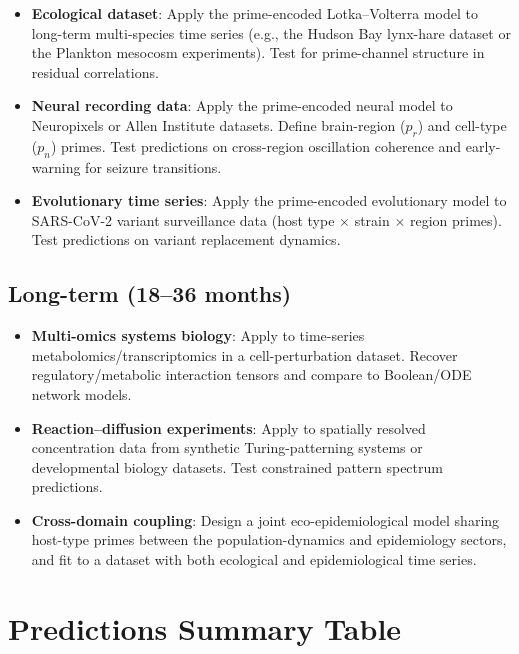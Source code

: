 \documentclass[12pt,letterpaper]{article}
\begin{document}
\begin{itemize}[leftmargin=*]
  \item \textbf{Ecological dataset}: Apply the prime-encoded Lotka--Volterra
    model to long-term multi-species time series (e.g., the Hudson Bay
    lynx-hare dataset or the Plankton mesocosm experiments). Test for
    prime-channel structure in residual correlations.
  \item \textbf{Neural recording data}: Apply the prime-encoded neural model
    to Neuropixels or Allen Institute datasets. Define brain-region ($p_r$)
    and cell-type ($p_n$) primes. Test predictions on cross-region oscillation
    coherence and early-warning for seizure transitions.
  \item \textbf{Evolutionary time series}: Apply the prime-encoded evolutionary
    model to SARS-CoV-2 variant surveillance data (host type $\times$ strain
    $\times$ region primes). Test predictions on variant replacement dynamics.
\end{itemize}

\subsection{Long-term (18--36 months)}

\begin{itemize}[leftmargin=*]
  \item \textbf{Multi-omics systems biology}: Apply to time-series
    metabolomics/transcriptomics in a cell-perturbation dataset. Recover
    regulatory/metabolic interaction tensors and compare to Boolean/ODE
    network models.
  \item \textbf{Reaction--diffusion experiments}: Apply to spatially resolved
    concentration data from synthetic Turing-patterning systems or
    developmental biology datasets. Test constrained pattern spectrum
    predictions.
  \item \textbf{Cross-domain coupling}: Design a joint eco-epidemiological
    model sharing host-type primes between the population-dynamics and
    epidemiology sectors, and fit to a dataset with both ecological and
    epidemiological time series.
\end{itemize}

\newpage
\section{Predictions Summary Table}
\label{sec:predictions}
\end{document}
